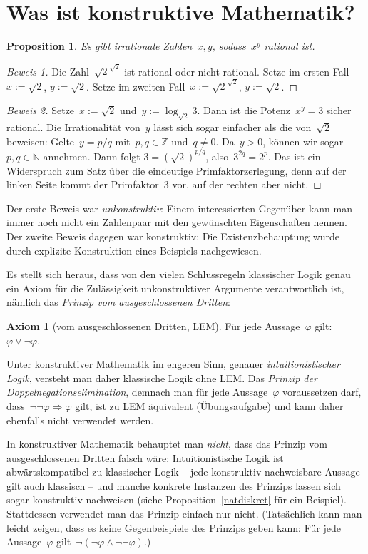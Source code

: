 \documentclass[a4paper,ngerman,12pt]{scrartcl}
\theoremstyle{definition}
\newtheorem{axiom}[defn]{Axiom}
\theoremstyle{plain}
\newtheorem{prop}[defn]{Proposition}
\theoremstyle{remark}
\newcommand{\ZZ}{\mathbb{Z}}
\newcommand{\NN}{\mathbb{N}}
\renewcommand{\_}{\mathpunct{.}\,}
\newcommand{\?}{\,{:}\,}
\begin{document}
\tableofcontents

\section{Was ist konstruktive Mathematik?}

\begin{prop}Es gibt irrationale Zahlen~$x,y$, sodass~$x^y$ rational ist.
\end{prop}
\begin{proof}[Beweis 1] Die Zahl~$\sqrt{2}^{\sqrt{2}}$ ist rational oder nicht
rational. Setze im ersten Fall~$x := \sqrt{2}$, $y := \sqrt{2}$. Setze im
zweiten Fall~$x := \sqrt{2}^{\sqrt{2}}$, $y := \sqrt{2}$.
\end{proof}
\begin{proof}[Beweis 2] Setze~$x := \sqrt{2}$ und~$y := \log_{\sqrt{2}} 3$.
Dann
ist die Potenz~$x^y = 3$ sicher rational. Die Irrationalität von~$y$ lässt sich
sogar einfacher als die von~$\sqrt{2}$ beweisen:
Gelte~$y = p/q$ mit~$p, q \in \ZZ$ und~$q \neq 0$. Da~$y > 0$, können wir
sogar~$p, q \in \NN$ annehmen.
Dann folgt $3 = (\sqrt{2})^{p/q}$, also~$3^{2q} = 2^p$. Das ist ein
Widerspruch zum Satz über die eindeutige Primfaktorzerlegung, denn auf der linken
Seite kommt der Primfaktor~$3$ vor, auf der rechten aber nicht.
\end{proof}

Der erste Beweis war \emph{unkonstruktiv}: Einem interessierten Gegenüber kann
man immer noch nicht ein Zahlenpaar mit den gewünschten Eigenschaften nennen.
Der zweite Beweis dagegen war konstruktiv: Die Existenzbehauptung wurde durch
explizite Konstruktion eines Beispiels nachgewiesen.

Es stellt sich heraus, dass von den vielen Schlussregeln klassischer Logik genau
ein Axiom für die Zulässigkeit unkonstruktiver Argumente verantwortlich ist,
nämlich das \emph{Prinzip vom ausgeschlossenen Dritten}:
\begin{axiom}[vom ausgeschlossenen Dritten, LEM]Für jede Aussage~$\varphi$ gilt: $\varphi \vee
\neg\varphi$.\end{axiom}
Unter konstruktiver Mathematik im engeren Sinn, genauer
\emph{intuitionistischer Logik}, versteht man daher klassische Logik ohne LEM.
Das \emph{Prinzip der Doppelnegationselimination}, demnach man für jede
Aussage~$\varphi$ voraussetzen darf, dass~$\neg\neg\varphi \Rightarrow \varphi$
gilt, ist zu LEM äquivalent (Übungsaufgabe) und kann daher ebenfalls nicht
verwendet werden.

In konstruktiver Mathematik behauptet man \emph{nicht}, dass das
Prinzip vom ausgeschlossenen Dritten falsch wäre: Intuitionistische Logik ist
abwärtskompatibel zu klassischer Logik -- jede konstruktiv nachweisbare Aussage
gilt auch klassisch -- und manche konkrete Instanzen des Prinzips lassen sich
sogar konstruktiv nachweisen (siehe Proposition~\ref{natdiskret} für ein Beispiel).
Stattdessen verwendet man das Prinzip einfach
nur nicht. (Tatsächlich kann man leicht zeigen, dass es keine Gegenbeispiele
des Prinzips geben kann: Für jede Aussage~$\varphi$ gilt~$\neg(\neg\varphi
\wedge \neg\neg\varphi)$.)
\end{document}
